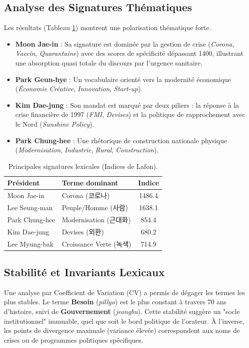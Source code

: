 \documentclass[11pt]{article}
\begin{document}
\subsection{Analyse des Signatures Thématiques}
Les résultats (Tableau \ref{tab:signatures_complete}) montrent une polarisation thématique forte.
\begin{itemize}
    \item \textbf{Moon Jae-in} : Sa signature est dominée par la gestion de crise (\textit{Corona}, \textit{Vaccin}, \textit{Quarantaine}) avec des scores de spécificité dépassant 1400, illustrant une absorption quasi totale du discours par l'urgence sanitaire.
    \item \textbf{Park Geun-hye} : Un vocabulaire orienté vers la modernité économique (\textit{Économie Créative}, \textit{Innovation}, \textit{Start-up}).
    \item \textbf{Kim Dae-jung} : Son mandat est marqué par deux piliers : la réponse à la crise financière de 1997 (\textit{FMI}, \textit{Devises}) et la politique de rapprochement avec le Nord (\textit{Sunshine Policy}).
    \item \textbf{Park Chung-hee} : Une rhétorique de construction nationale physique (\textit{Modernisation}, \textit{Industrie}, \textit{Rural}, \textit{Construction}).
\end{itemize}

\begin{table}[t]
\centering
\small
\begin{tabular}{llc}
\toprule
\textbf{Président} & \textbf{Terme dominant} & \textbf{Indice} \\
\midrule
Moon Jae-in & Corona (코로나) & 1486.4 \\
Lee Seung-man & Peuple/Homme (사람) & 1638.1 \\
Park Chung-hee & Modernisation (근대화) & 854.4 \\
Kim Dae-jung & Devises (외환) & 680.2 \\
Lee Myung-bak & Croissance Verte (녹색) & 714.9 \\
\bottomrule
\end{tabular}
\caption{Principales signatures lexicales (Indices de Lafon).}
\label{tab:signatures_complete}
\end{table}

\subsection{Stabilité et Invariants Lexicaux}
Une analyse par Coefficient de Variation (CV) a permis de dégager les termes les plus stables. Le terme \textbf{Besoin} (\textit{pillyo}) est le plus constant à travers 70 ans d'histoire, suivi de \textbf{Gouvernement} (\textit{jeongbu}). Cette stabilité suggère un "socle institutionnel" immuable, quel que soit le bord politique de l'orateur. À l'inverse, les points de divergence maximale (variance élevée) correspondent aux noms de crises ou de programmes politiques spécifiques.
\end{document}
